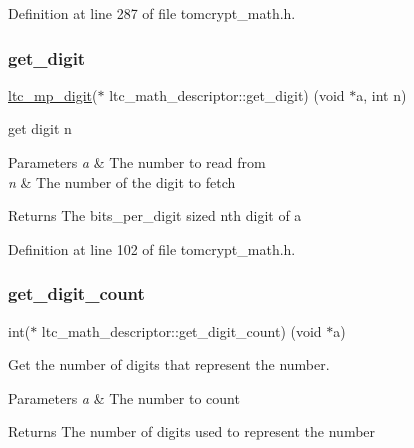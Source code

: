Definition at line 287 of file tomcrypt\+\_\+math.\+h.

\mbox{\label{structltc__math__descriptor_adb2107094f3c0aa279a3f12977672a78}} 
\subsubsection{\texorpdfstring{get\_digit}{get\_digit}}
{\footnotesize\ttfamily \mbox{\hyperlink{tomcrypt__cfg_8h_a4e98fa26a5de0ac87e06af901bad57c4}{ltc\+\_\+mp\+\_\+digit}}($\ast$ ltc\+\_\+math\+\_\+descriptor\+::get\+\_\+digit) (void $\ast$a, int n)}



get digit n 


\begin{DoxyParams}{Parameters}
{\em a} & The number to read from \\
\hline
{\em n} & The number of the digit to fetch \\
\hline
\end{DoxyParams}
\begin{DoxyReturn}{Returns}
The bits\+\_\+per\+\_\+digit sized n\textquotesingle{}th digit of a 
\end{DoxyReturn}


Definition at line 102 of file tomcrypt\+\_\+math.\+h.

\mbox{\label{structltc__math__descriptor_ae185e44bd77639feb5c360b10bf826ca}} 
\subsubsection{\texorpdfstring{get\_digit\_count}{get\_digit\_count}}
{\footnotesize\ttfamily int($\ast$ ltc\+\_\+math\+\_\+descriptor\+::get\+\_\+digit\+\_\+count) (void $\ast$a)}



Get the number of digits that represent the number. 


\begin{DoxyParams}{Parameters}
{\em a} & The number to count \\
\hline
\end{DoxyParams}
\begin{DoxyReturn}{Returns}
The number of digits used to represent the number 
\end{DoxyReturn}



